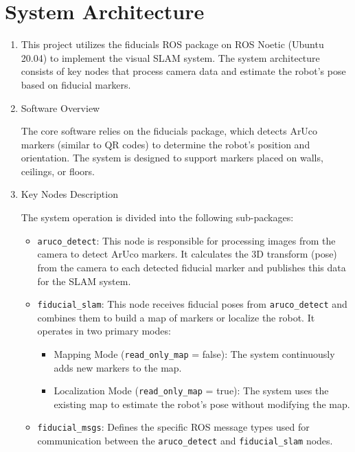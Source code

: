 \documentclass[10pt]{article}
\begin{document}
\section{System Architecture}

\begin{enumerate}
    \item This project utilizes the fiducials ROS package on ROS Noetic (Ubuntu 20.04) to implement the visual SLAM system. The system architecture consists of key nodes that process camera data and estimate the robot's pose based on fiducial markers.

    \item Software Overview

    The core software relies on the fiducials package, which detects ArUco markers (similar to QR codes) to determine the robot's position and orientation. The system is designed to support markers placed on walls, ceilings, or floors.

    \item Key Nodes Description

    The system operation is divided into the following sub-packages:
    \begin{itemize}
        \item \texttt{aruco\_detect}: This node is responsible for processing images from the camera to detect ArUco markers. It calculates the 3D transform (pose) from the camera to each detected fiducial marker and publishes this data for the SLAM system.
        \item \texttt{fiducial\_slam}: This node receives fiducial poses from \texttt{aruco\_detect} and combines them to build a map of markers or localize the robot. It operates in two primary modes:
        \begin{itemize}
            \item Mapping Mode (\texttt{read\_only\_map} = false): The system continuously adds new markers to the map.
            \item Localization Mode (\texttt{read\_only\_map} = true): The system uses the existing map to estimate the robot's pose without modifying the map.
        \end{itemize}
        \item \texttt{fiducial\_msgs}: Defines the specific ROS message types used for communication between the \texttt{aruco\_detect} and \texttt{fiducial\_slam} nodes.
    \end{itemize}
\end{enumerate}
\end{document}

